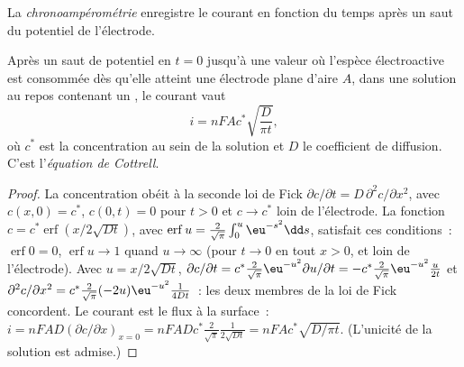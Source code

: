 \begin{definition}[Chronoampérométrie]\label{def:b3:electrode-kinetics:chronoamperometry}
La \emph{chronoampérométrie} enregistre le courant en
fonction du temps après un saut du potentiel de l'électrode.
\end{definition}

\begin{theorem}\label{thm:b3:electrode-kinetics:cottrell}
Après un saut de potentiel en $t = 0$ jusqu'à une valeur où l'espèce
électroactive est consommée dès qu'elle atteint une électrode plane
d'aire $A$, dans une solution au repos contenant un ,
le courant vaut
\[
  i = nFAc^*\sqrt{\frac{D}{\pi t}},
\]
où $c^*$ est la concentration au sein de la solution et $D$ le
coefficient de diffusion. C'est
l'\emph{équation de Cottrell}.
\end{theorem}

\begin{proof}
La concentration obéit à la seconde loi de Fick $\partial c/\partial t = D\,\partial^2c/\partial x^2$, avec $c(x, 0) = c^*$,
$c(0, t) = 0$ pour $t > 0$ et $c \to c^*$ loin de l'électrode. La fonction $c = c^*\operatorname{erf}(x/2\sqrt{Dt})$, avec
$\operatorname{erf}u = \frac{2}{\sqrt\pi}\int_0^u\eu^{-s^2}\dd s$, satisfait ces conditions~: $\operatorname{erf}0 = 0$, $\operatorname{erf}u \to 1$ quand $u \to \infty$
(pour $t \to 0$ en tout $x > 0$, et loin de l'électrode). Avec $u = x/2\sqrt{Dt}$,
$\partial c/\partial t = c^*\frac{2}{\sqrt\pi}\eu^{-u^2}\partial u/\partial t = -c^*\frac{2}{\sqrt\pi}\eu^{-u^2}\frac{u}{2t}$ et $\partial^2c/\partial x^2 = c^*\frac{2}{\sqrt\pi}(-2u)\eu^{-u^2}\frac{1}{4Dt}$~:
les deux membres de la loi de Fick concordent. Le courant est le flux à
la surface~: $i =
nFAD(\partial c/\partial x)_{x = 0} = nFADc^*\frac{2}{\sqrt\pi}\frac{1}{2\sqrt{Dt}} = nFAc^*\sqrt{D/\pi t}$.
(L'unicité de la solution est
admise.)
\end{proof}

